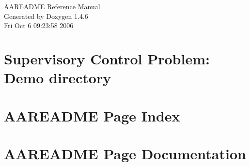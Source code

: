 \documentclass[a4paper]{book}
\begin{document}
\begin{titlepage}
\vspace*{7cm}
\begin{center}
{\Large AAREADME Reference Manual}\\
\vspace*{1cm}
{\large Generated by Doxygen 1.4.6}\\
\vspace*{0.5cm}
{\small Fri Oct 6 09:23:58 2006}\\
\end{center}
\end{titlepage}
\clearemptydoublepage
{}
\tableofcontents
\clearemptydoublepage
{}
\chapter{Supervisory Control Problem: Demo directory }
\label{index}
\chapter{AAREADME Page Index}

\chapter{AAREADME Page Documentation}

\printindex
\end{document}
